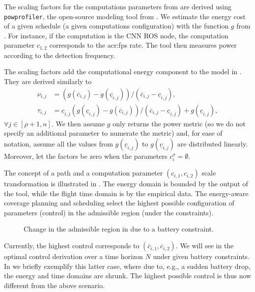 The scaling factors for the computations parameters from  are derived using {\small\tt{powprofiler}}, the open-source modeling tool from . We estimate the energy cost of a given schedule (a given computations configuration) with the function $g$ from . 
For instance, if the computation is the CNN ROS node, the computation parameter $c_{1,2}$ corresponds to the \Gls{acr:fps} rate. The tool then measures power according to the detection frequency.

The scaling factors add the computational energy component to the model in . They are derived similarly to 
\begin{subequations}\label{eq:scale-comp}\begin{align}
  \nu_{i,j}&=(g(\overline{c}_{i,j})-g(\underline{c}_{i,j}))/(\overline{c}_{i,j}-\underline{c}_{i,j}),\\
  \tau_{i,j}&=\underline{c}_{i,j}(g(\underline{c}_{i,j})-g(\overline{c}_{i,j}))/(\overline{c}_{i,j}-\underline{c}_{i,j})+g(\underline{c}_{i,j}),
\end{align}\end{subequations}
$\forall j\in[\rho+1,n]$. We then assume $g$ only returns the power metric (so we do not specify an additional parameter to numerate the metric) and, for ease of notation, assume all the values from $g(\underline{c}_{i,j})$ to $g(\underline{c}_{i,j})$ are distributed linearly. Moreover, let the factors be zero when the parameters $c_i^\sigma=\emptyset$.

The concept of a path and a computation parameter $(c_{i,1},c_{i,2})$ scale transformation is illustrated in . 
The energy domain is bounded by the output of the \powprof{} tool, while the flight time domain is by the empirical data. The energy-aware coverage planning and scheduling select the highest possible configuration of parameters (control) in the admissible region (under the constraints). 
\begin{figure}[h!]
  \sfr
  \centering
  \selectfont
  
  \caption[Change in the admissible region]{Change in the admissible region in  due to a battery constraint.}
  \label{fig:plot-7}
  \efr
\end{figure}
Currently, the highest control corresponds to $(\overline{c}_{i,1},\overline{c}_{i,2})$. We will see in  the optimal control derivation over a time horizon $N$ under given battery constraints.
In  we briefly exemplify this latter case, where due to, e.g., a sudden battery drop, the energy and time domains are shrunk. The highest possible control is thus now different from the above scenario.

